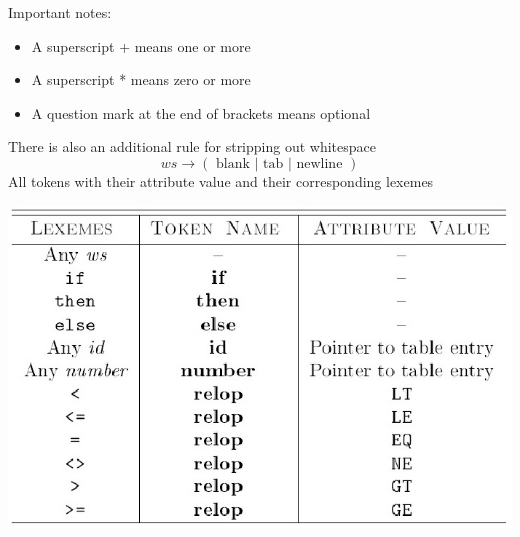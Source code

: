 \documentclass{article}[18pt]
\begin{document}
Important notes:
\begin{itemize}
	\item A superscript + means one or more
	\item A superscript * means zero or more
	\item A question mark at the end of brackets means optional
\end{itemize}
There is also an additional rule for stripping out whitespace
$$ws\rightarrow (\text{ blank }|   \text{ tab }  |  \text{ newline } )$$
All tokens with their attribute value and their corresponding lexemes
\begin{center}
	\includegraphics[scale=0.5]{"attribute value"}
\end{center}
\end{document}
